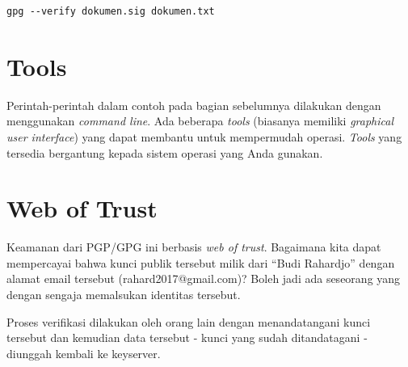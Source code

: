 \begin{mdframed}
\begin{verbatim}
gpg --verify dokumen.sig dokumen.txt
\end{verbatim}
\end{mdframed}

\begin{mdframed}[backgroundcolor=blue!20]
\begin{ExerciseList}
   \Exercise[title=Verifikasi]
\end{ExerciseList}
\end{mdframed}

\section{Tools}
Perintah-perintah dalam contoh pada bagian sebelumnya dilakukan dengan
menggunakan {\em command line}. Ada beberapa {\em tools} (biasanya memiliki
{\em graphical user interface}) yang dapat membantu untuk mempermudah operasi.
{\em Tools} yang tersedia bergantung kepada sistem operasi yang Anda gunakan. 


\section{Web of Trust}
Keamanan dari PGP/GPG ini berbasis {\em web of trust}. Bagaimana kita dapat
mempercayai bahwa kunci publik tersebut milik dari ``Budi Rahardjo'' dengan
alamat email tersebut (rahard2017@gmail.com)? Boleh jadi ada seseorang yang
dengan sengaja memalsukan identitas tersebut. 

Proses verifikasi dilakukan oleh orang lain dengan menandatangani kunci
tersebut dan kemudian data tersebut - kunci yang sudah ditandatagani - diunggah
kembali ke keyserver. 
